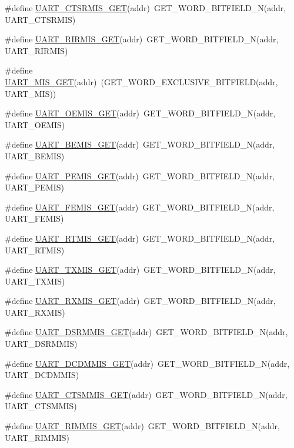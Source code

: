 \begin{DoxyCompactItemize}
\item 
\#define \hyperlink{a00574_a107c7a41cdbbf26682238894b7d72c7c}{UART\_\-CTSRMIS\_\-GET}(addr)~GET\_\-WORD\_\-BITFIELD\_\-N(addr, UART\_\-CTSRMIS)
\item 
\#define \hyperlink{a00574_adc6f2cf3c162676200b613e19acfb902}{UART\_\-RIRMIS\_\-GET}(addr)~GET\_\-WORD\_\-BITFIELD\_\-N(addr, UART\_\-RIRMIS)
\item 
\#define \hyperlink{a00574_aeb1ec386d9a7c8ce0f7099f4e406d465}{UART\_\-MIS\_\-GET}(addr)~(GET\_\-WORD\_\-EXCLUSIVE\_\-BITFIELD(addr, UART\_\-MIS))
\item 
\#define \hyperlink{a00574_a9ae46d845f60ef0adcf34f8e8dae3150}{UART\_\-OEMIS\_\-GET}(addr)~GET\_\-WORD\_\-BITFIELD\_\-N(addr, UART\_\-OEMIS)
\item 
\#define \hyperlink{a00574_a9423f302bad1bbc22902cff6f7224d47}{UART\_\-BEMIS\_\-GET}(addr)~GET\_\-WORD\_\-BITFIELD\_\-N(addr, UART\_\-BEMIS)
\item 
\#define \hyperlink{a00574_a7eb85fed74ec6944ab5054939e419389}{UART\_\-PEMIS\_\-GET}(addr)~GET\_\-WORD\_\-BITFIELD\_\-N(addr, UART\_\-PEMIS)
\item 
\#define \hyperlink{a00574_a1a493a42ad5e68de1bc6363306a7b242}{UART\_\-FEMIS\_\-GET}(addr)~GET\_\-WORD\_\-BITFIELD\_\-N(addr, UART\_\-FEMIS)
\item 
\#define \hyperlink{a00574_a3cb0733497409389437f3ced760d10c0}{UART\_\-RTMIS\_\-GET}(addr)~GET\_\-WORD\_\-BITFIELD\_\-N(addr, UART\_\-RTMIS)
\item 
\#define \hyperlink{a00574_aa0f8a32dde91d7e07bb9433cb6805ea2}{UART\_\-TXMIS\_\-GET}(addr)~GET\_\-WORD\_\-BITFIELD\_\-N(addr, UART\_\-TXMIS)
\item 
\#define \hyperlink{a00574_a32be686f14f4b5ac22c1e35cb1bba5cf}{UART\_\-RXMIS\_\-GET}(addr)~GET\_\-WORD\_\-BITFIELD\_\-N(addr, UART\_\-RXMIS)
\item 
\#define \hyperlink{a00574_a06fcfccf9b7d94169d88beb6a8947db3}{UART\_\-DSRMMIS\_\-GET}(addr)~GET\_\-WORD\_\-BITFIELD\_\-N(addr, UART\_\-DSRMMIS)
\item 
\#define \hyperlink{a00574_aab8f8b83c05403e2c0f1cdba2c1539c7}{UART\_\-DCDMMIS\_\-GET}(addr)~GET\_\-WORD\_\-BITFIELD\_\-N(addr, UART\_\-DCDMMIS)
\item 
\#define \hyperlink{a00574_a405554bd21eb2bfb359dec0537a13b45}{UART\_\-CTSMMIS\_\-GET}(addr)~GET\_\-WORD\_\-BITFIELD\_\-N(addr, UART\_\-CTSMMIS)
\item 
\#define \hyperlink{a00574_a8e89cf226b9493b2d84443c53ae32cbc}{UART\_\-RIMMIS\_\-GET}(addr)~GET\_\-WORD\_\-BITFIELD\_\-N(addr, UART\_\-RIMMIS)

\end{DoxyCompactItemize}
